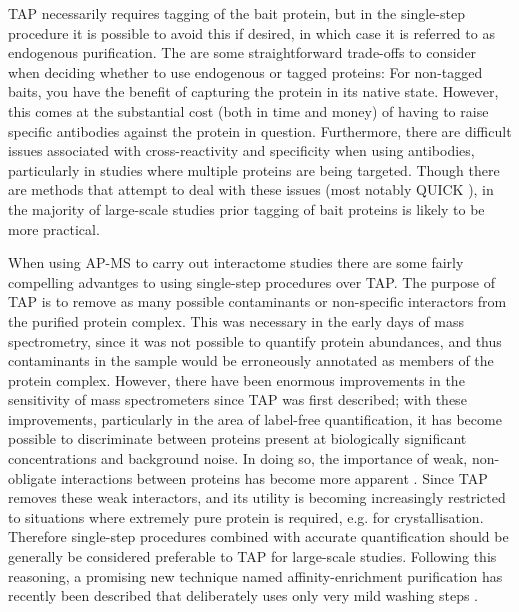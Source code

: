 \documentclass[a4paper,11pt,twoside,openright]{scrbook}
\begin{document}
TAP necessarily requires tagging of the bait protein, but in the single-step procedure it is possible to avoid this if desired, in which case it is referred to as endogenous purification. The are some straightforward trade-offs to consider when deciding whether to use endogenous or tagged proteins: For non-tagged baits, you have the benefit of capturing the protein in its native state. However, this comes at the substantial cost (both in time and money) of having to raise specific antibodies against the protein in question. Furthermore, there are difficult issues associated with cross-reactivity and specificity when using antibodies, particularly in studies where multiple proteins are being targeted. Though there are methods that attempt to deal with these issues (most notably QUICK \cite{Selbach2006}), in the majority of large-scale studies prior tagging of bait proteins is likely to be more practical.

When using AP-MS to carry out interactome studies there are some fairly compelling advantges to using single-step procedures over TAP. The purpose of TAP is to remove as many possible contaminants or non-specific interactors from the purified protein complex. This was necessary in the early days of mass spectrometry, since it was not possible to quantify protein abundances, and thus contaminants in the sample would be erroneously annotated as members of the protein complex. However, there have been enormous improvements in the sensitivity of mass spectrometers since TAP was first described; with these improvements, particularly in the area of label-free quantification, it has become possible to discriminate between proteins present at biologically significant concentrations and background noise. In doing so, the importance of weak, non-obligate interactions between proteins has become more apparent \cite{Perkins2010a,Hein2015}. Since TAP removes these weak interactors, and its utility is becoming increasingly restricted to situations where extremely pure protein is required, e.g. for crystallisation. Therefore single-step procedures combined with accurate quantification should be generally be considered preferable to TAP for large-scale studies. Following this reasoning, a promising new technique named affinity-enrichment purification has recently been described that deliberately uses only very mild washing steps \cite{Keilhauer2015}.
\end{document}

